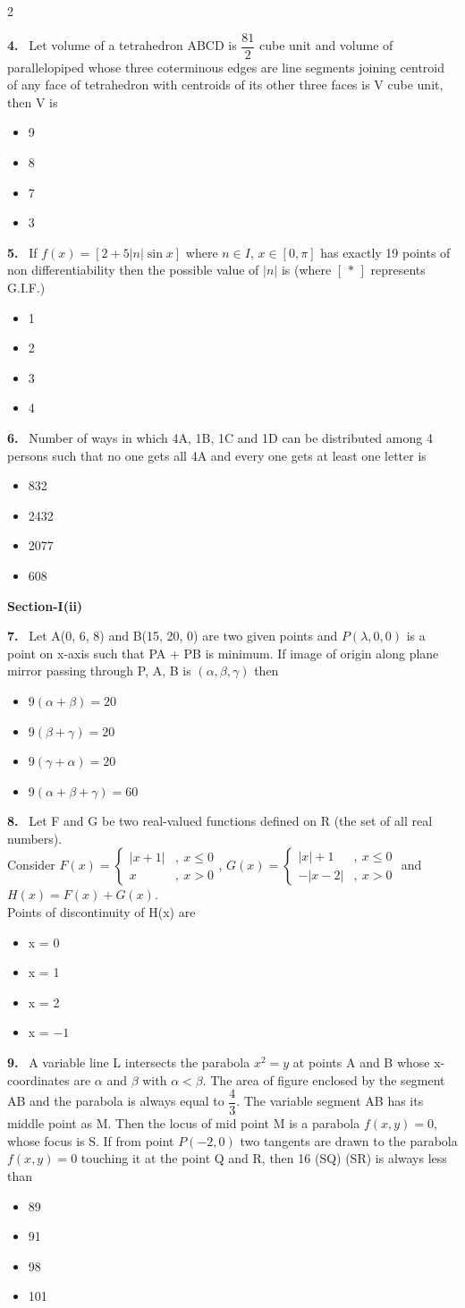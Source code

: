 \documentclass[10pt]{extarticle}
\newcommand{\sect}[1]{\par\smallskip\noindent\textbf{#1}\par}
\newcommand{\qn}[1]{\par\smallskip\noindent\textbf{#1.}~}
\newenvironment{qoptions}{\begin{itemize}[leftmargin=1.8em,itemsep=1pt,topsep=2pt,label={}]}{\end{itemize}}
\newcommand{\opt}[2]{\item[(#1)] #2}
\begin{document}
\begin{multicols}{2}
\qn{4} Let volume of a tetrahedron ABCD is $\dfrac{81}2$ cube unit and volume of parallelopiped whose three coterminous edges are line segments joining centroid of any face of tetrahedron with centroids of its other three faces is V cube unit, then V is
\begin{qoptions}
\opt{A}{9}
\opt{B}{8}
\opt{C}{7}
\opt{D}{3}
\end{qoptions}

\qn{5} If $f(x)=[2+5|n|\sin x]$ where $n\in I$, $x\in[0,\pi]$ has exactly 19 points of non differentiability then the possible value of $|n|$ is (where $[\,*\,]$ represents G.I.F.)
\begin{qoptions}
\opt{A}{1}
\opt{B}{2}
\opt{C}{3}
\opt{D}{4}
\end{qoptions}

\qn{6} Number of ways in which 4A, 1B, 1C and 1D can be distributed among 4 persons such that no one gets all 4A and every one gets at least one letter is
\begin{qoptions}
\opt{A}{832}
\opt{B}{2432}
\opt{C}{2077}
\opt{D}{608}
\end{qoptions}

\sect{Section-I(ii)}

\qn{7} Let A(0, 6, 8) and B(15, 20, 0) are two given points and $P(\lambda,0,0)$ is a point on x-axis such that PA + PB is minimum. If image of origin along plane mirror passing through P, A, B is $(\alpha,\beta,\gamma)$ then
\begin{qoptions}
\opt{A}{$9(\alpha+\beta)=20$}
\opt{B}{$9(\beta+\gamma)=20$}
\opt{C}{$9(\gamma+\alpha)=20$}
\opt{D}{$9(\alpha+\beta+\gamma)=60$}
\end{qoptions}

\qn{8} Let F and G be two real-valued functions defined on R (the set of all real numbers).\\
Consider $F(x)=\begin{cases}|x+1|&,\ x\leqslant0\\ x&,\ x>0\end{cases}$, $G(x)=\begin{cases}|x|+1&,\ x\leqslant0\\ -|x-2|&,\ x>0\end{cases}$ and $H(x)=F(x)+G(x)$.\\
Points of discontinuity of H(x) are
\begin{qoptions}
\opt{A}{x = 0}
\opt{B}{x = 1}
\opt{C}{x = 2}
\opt{D}{x = $-1$}
\end{qoptions}

\qn{9} A variable line L intersects the parabola $x^2=y$ at points A and B whose x-coordinates are $\alpha$ and $\beta$ with $\alpha<\beta$. The area of figure enclosed by the segment AB and the parabola is always equal to $\dfrac43$. The variable segment AB has its middle point as M. Then the locus of mid point M is a parabola $f(x,y)=0$, whose focus is S. If from point $P(-2,0)$ two tangents are drawn to the parabola $f(x,y)=0$ touching it at the point Q and R, then 16 (SQ) (SR) is always less than
\begin{qoptions}
\opt{A}{89}
\opt{B}{91}
\opt{C}{98}
\opt{D}{101}
\end{qoptions}


\end{multicols}
\end{document}
